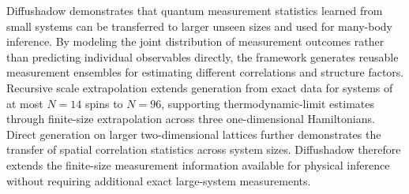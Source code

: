 \documentclass[pdflatex,sn-nature]{sn-jnl}%
\theoremstyle{thmstyleone}%
\theoremstyle{thmstyletwo}%
\theoremstyle{thmstylethree}%
\begin{document}



Diffushadow demonstrates that quantum measurement statistics learned from small systems can be transferred to larger unseen sizes and used for many-body inference. By modeling the joint distribution of measurement outcomes rather than predicting individual observables directly, the framework generates reusable measurement ensembles for estimating different correlations and structure factors. Recursive scale extrapolation extends generation from exact data for systems of at most $N=14$ spins to $N=96$, supporting thermodynamic-limit estimates through finite-size extrapolation across three one-dimensional Hamiltonians. Direct generation on larger two-dimensional lattices further demonstrates the transfer of spatial correlation statistics across system sizes. Diffushadow therefore extends the finite-size measurement information available for physical inference without requiring additional exact large-system measurements.
\end{document}
